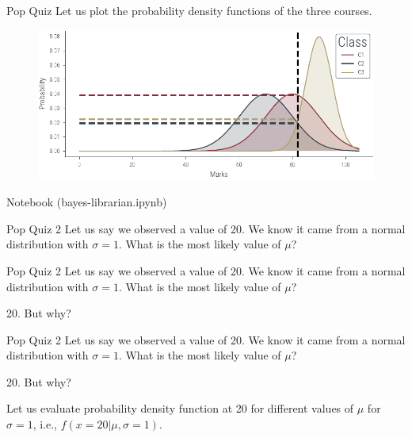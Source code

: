 \documentclass[handout]{beamer}
\begin{document}
\begin{frame}{Pop Quiz}
    Let us plot the probability density functions of the three courses. 
    \begin{figure}
        \includegraphics[width=\textwidth]{../figures/mle/mle-example-2.pdf}
    \end{figure}
    
\end{frame}

\begin{frame}
  Notebook (bayes-librarian.ipynb)
\end{frame}

\begin{frame}{Pop Quiz 2}
    Let us say we observed a value of 20. We know it came from a normal distribution with $\sigma=1$. What is the most likely value of $\mu$?
    


\end{frame}

\begin{frame}{Pop Quiz 2}
    Let us say we observed a value of 20. We know it came from a normal distribution with $\sigma=1$. What is the most likely value of $\mu$?
    
    20. But why?


\end{frame}

\begin{frame}{Pop Quiz 2}
    Let us say we observed a value of 20. We know it came from a normal distribution with $\sigma=1$. What is the most likely value of $\mu$?
    
    20. But why?

    Let us evaluate probability density function at 20 for different values of $\mu$ for $\sigma=1$, i.e., $f(x=20|\mu, \sigma=1)$.


\end{frame}
\end{document}
